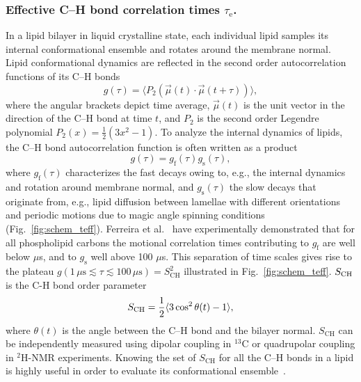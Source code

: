 \documentclass[journal=jcisd8,manuscript=article,layout=twocolumn]{achemso}
\begin{document}
\subsubsection*{Effective C--H bond correlation times $\tau_\mathrm{e}$.}
In a lipid bilayer in liquid crystalline state, each individual lipid samples its internal conformational
ensemble and rotates around the membrane normal.
Lipid conformational dynamics are reflected in the second order autocorrelation functions of its C--H bonds
\begin{equation}
\label{eq:BCF}
g(\tau)=\langle P_{2}\left(\vec{\mu}(t)\cdot \vec{\mu}(t+\tau)\right)\rangle ,
\end{equation}
where the angular brackets depict time average,
$\vec{\mu}(t)$ is the unit vector in the direction of the \mbox{C--H} bond at time $t$, and $P_{2}$ is the second order Legendre polynomial $P_2(x)=\frac{1}{2}(3x^2-1)$.
%
To analyze the internal dynamics of lipids, 
the \mbox{C--H} bond autocorrelation function %
is often written as a product %
\begin{equation}
g(\tau)=g_{\mathrm{f}}(\tau)g_{\mathrm{s}}(\tau) ,
\end{equation}
where $g_{\mathrm{f}}(\tau)$ characterizes the fast decays owing to, e.g., the internal dynamics and rotation around membrane normal, and $g_{\mathrm{s}}(\tau)$ the slow decays that originate from, e.g., lipid diffusion between lamellae with different orientations and periodic motions due to magic angle spinning conditions (Fig.~\ref{fig:schem_teff}).
Ferreira et al.~\cite{ferreira15} have experimentally demonstrated that for all phospholipid carbons
the motional correlation times contributing to $g_{\mathrm{f}}$ are well below $\mu$s, and to $g_{\mathrm{s}}$ well above 100 $\mu$s.
This separation of time scales gives rise to the plateau $g(1\,\mu\mathrm s  \lesssim \tau \lesssim 100\,\mu\mathrm s)=S^2_\mathrm{CH}$ illustrated in Fig.~\ref{fig:schem_teff}.
%
$S_{\rm{CH}}$ is the C-H bond order parameter
\begin{equation}
\label{eq:OP}
S_{\rm{CH}}=\frac{1}{2}\langle 3\cos^{2}\theta(t)-1\rangle ,
\end{equation}
where $\theta(t)$ is the angle between the C--H bond and the bilayer normal.
$S_\mathrm{CH}$ can be independently measured using dipolar coupling in $^{13}$C or quadrupolar coupling in $^{2}$H-NMR experiments.
Knowing the set of $S_\mathrm{CH}$ for all the \mbox{C--H} bonds in a lipid
is highly useful in order to evaluate its conformational ensemble~\cite{Ollila:2016a}.
\end{document}
